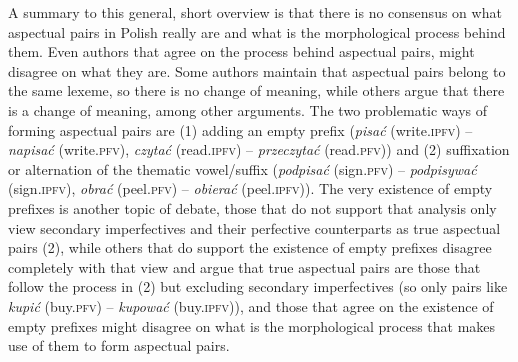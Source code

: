 \documentclass[12pt]{article}
\newcommand{\ita}[1]{\textit{#1}}
\begin{document}
A summary to this general, short overview is that there is no consensus on what aspectual pairs in Polish really are and what is the morphological process behind them. Even authors that agree on the process behind aspectual pairs, might disagree on what they are. Some authors maintain that aspectual pairs belong to the same lexeme, so there is no change of meaning, while others argue that there is a change of meaning, among other arguments. The two problematic ways of forming aspectual pairs are (1) adding an empty prefix (\textit{pisać} (write.\textsc{ipfv}) -- \textit{napisać} (write.\textsc{pfv}), \ita{czytać} (read.\textsc{ipfv}) -- \ita{przeczytać} (read.\textsc{pfv}))  and (2) suffixation or alternation of the thematic vowel/suffix (\ita{podpisać} (sign.\textsc{pfv}) -- \ita{podpisywać} (sign.\textsc{ipfv}), \ita{obrać} (peel.\textsc{pfv}) -- \ita{obierać} (peel.\textsc{ipfv})). The very existence of empty prefixes is another topic of debate, those that do not support that analysis only view secondary imperfectives and their perfective counterparts as true aspectual pairs (2), while others that do support the existence of empty prefixes disagree completely with that view and argue that true aspectual pairs are those that follow the process in (2) but excluding secondary imperfectives (so only pairs like \textit{kupić} (buy.\textsc{pfv}) -- \textit{kupować} (buy.\textsc{ipfv})), and those that agree on the existence of empty prefixes might disagree on what is the morphological process that makes use of them to form aspectual pairs.




\end{document}
